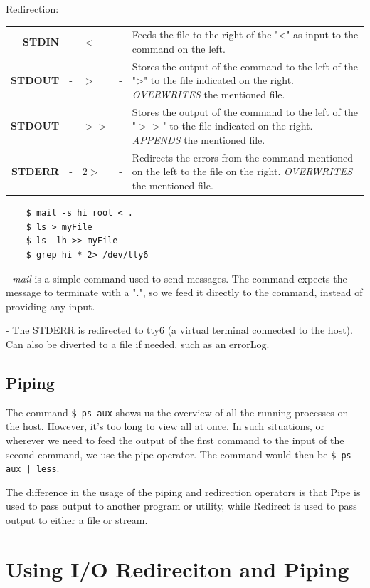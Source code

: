 \documentclass{report}
\begin{document}
	\noindent
	Redirection:
	
	\noindent
	\begin{tabular}{rclcp{}}
		\textbf{STDIN} &- &$<$ &- &Feeds the file to the right of the "<" as input to the command on the left. \\
		\textbf{STDOUT} &- &$>$ &- &Stores the output of the command to the left of the ">" to the file indicated on the right. \textit{OVERWRITES} the mentioned file.\\
		\textbf{STDOUT} &- &$>>$ &- &Stores the output of the command to the left of the "$>>$" to the file indicated on the right. \textit{APPENDS} the mentioned file.\\
		\textbf{STDERR} &- &$2>$ &- &Redirects the errors from the command mentioned on the left to the file on the right. \textit{OVERWRITES} the mentioned file.\\
	\end{tabular}
		
	\noindent
	\begin{verbatim}	
	$ mail -s hi root < .
	$ ls > myFile
	$ ls -lh >> myFile
	$ grep hi * 2> /dev/tty6
	\end{verbatim}
	
	 - \textit{mail} is a simple command used to send messages. The command expects the message to terminate with a ".", so we feed it directly to the command, instead of providing any input.
	
	 - The STDERR is redirected to tty6 (a virtual terminal connected to the host). Can also be diverted to a file if needed, such as an errorLog.
	
	\subsection{Piping}
	The command \verb|$ ps aux| shows us the overview of all the running processes on the host. However, it's too long to view all at once. In such situations, or wherever we need to feed the output of the first command to the input of the second command, we use the pipe operator. The command would then be \verb=$ ps aux | less=.
	
	The difference in the usage of the piping and redirection operators is that Pipe is used to pass output to another program or utility, while Redirect is used to pass output to either a file or stream.
	
	\section{Using I/O Redireciton and Piping}
	
\end{document}

